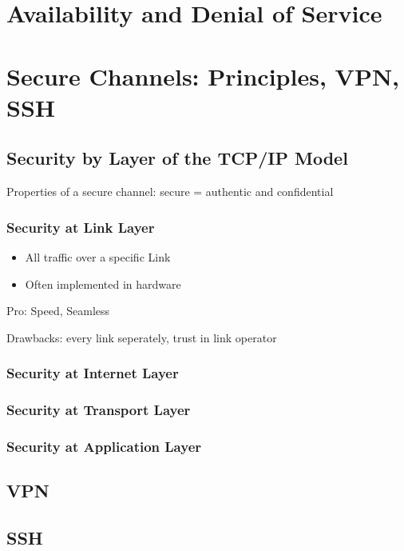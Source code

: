 \documentclass[fs, footer]{latex4ei}
\begin{document}
\begin{multicols*}{4}
\section{Availability and Denial of Service}

\section{Secure Channels: Principles, VPN, SSH}

\subsection{Security by Layer of the TCP/IP Model}
Properties of a secure channel: secure = authentic and confidential

\subsubsection{Security at Link Layer}
\begin{itemize}
	\item All traffic over a specific Link
	\item Often implemented in hardware
\end{itemize}

Pro: Speed, Seamless

Drawbacks: every link seperately, trust in link operator

\subsubsection{Security at Internet Layer}

\subsubsection{Security at Transport Layer}

\subsubsection{Security at Application Layer}

\subsection{VPN}

\subsection{SSH}


\end{multicols*}
\end{document}
